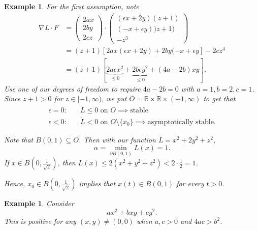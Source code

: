 \documentclass{tufte-handout}
\newcommand*\R{\mathbb{R}}
\newtheorem{ex}[thm]{Example}
\theoremstyle{definition}
\begin{document}
\begin{ex}
	For the first assumption, note
	\begin{align*}
		\nabla L \cdot  F &= \begin{pmatrix}
		2ax \\
		2by \\ 2cz
		\end{pmatrix} \cdot \begin{pmatrix}
		\left( \epsilon x +2y\right) (z+1) \\
		(-x + \epsilon y))z+1) \\
		-z^3
		\end{pmatrix}  \\
						  &= \left( z+1 \right) \left[ 2ax\left( \epsilon x + 2y \right) + 2by (-x + \epsilon y \right] - 2cz^{4} \\
						  &= (z+1) \left[ \underbrace{2a \epsilon x^2}_{\le 0} + \underbrace{2b\epsilon y^2}_{\le 0} + \left( 4a - 2b \right)xy \right]
	.\end{align*}
	Use one of our degrees of freedom to require $4a - 2b = 0$ with $a= 1, b=2, c= 1$. Since $z+1 > 0$ for $z \in [-1,\infty)$, we put $O = \R\times \R\times (-1,\infty)$ to get that
	\begin{align*}
		\epsilon = 0:& \quad \dot{L} \le 0 \text{ on } O \implies \text{stable} \\
		\epsilon < 0:& \quad \dot{L} < 0 \text{ on } O \setminus \{x_0\} \implies \text{asymptotically stable}
	.\end{align*}

	Note that $B(0,1) \subseteq O$. Then with our function $L = x^2+ 2y^2 + z^2$, \[
		\alpha = \min_{\partial B(0,1)} L(x) = 1
	.\] If $x \in B(0,\frac{1}{\sqrt{2} })$, then $L(x) \le 2(x^2+y^2+z^2) < 2 \cdot \frac{1}{2} = 1$. 

	Hence, $x_0 \in B(0,\frac{1}{\sqrt{2} })$ implies that $x(t) \in B(0,1)$ for every $t > 0$.
\end{ex}

\begin{ex}
	Consider \[
	ax^2 + bxy + cy^2.\] This is positive for any $(x,y) \ne (0,0)$ when $a,c > 0$ and $4ac > b^2$.
\end{ex}
\end{document}
